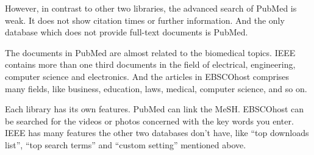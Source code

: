 \begin{enumerate}
    However, in contrast to other two libraries, the advanced search of PubMed is weak. 
    It does not show citation times or further information.
    And the only database which does not provide full-text documents is PubMed. 

    The documents in PubMed are almost related to the biomedical topics.
    IEEE contains more than one third documents in the field of electrical, engineering, computer science and electronics.
    And the articles in EBSCOhost comprises many fields, like business, education, laws, medical, computer science, and so on.

    Each library has its own features. PubMed can link the MeSH. EBSCOhost can be searched for the videos or photos concerned with the key words you enter. 
    IEEE has many features the other two databases don’t have, like “top downloads list”, “top search terms” and “custom setting” mentioned above.

    

\end{enumerate}


